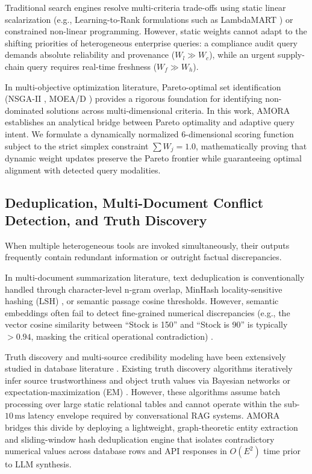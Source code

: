 \documentclass[journal,10pt,twocolumn]{IEEEtran}
\begin{document}
Traditional search engines resolve multi-criteria trade-offs using static linear scalarization (e.g., Learning-to-Rank formulations such as LambdaMART \cite{burges2010lambdamart}) or constrained non-linear programming. However, static weights cannot adapt to the shifting priorities of heterogeneous enterprise queries: a compliance audit query demands absolute reliability and provenance ($W_l \gg W_c$), while an urgent supply-chain query requires real-time freshness ($W_f \gg W_h$).

In multi-objective optimization literature, Pareto-optimal set identification (NSGA-II \cite{deb2002fast}, MOEA/D \cite{zhang2007moea}) provides a rigorous foundation for identifying non-dominated solutions across multi-dimensional criteria. In this work, AMORA establishes an analytical bridge between Pareto optimality and adaptive query intent. We formulate a dynamically normalized 6-dimensional scoring function subject to the strict simplex constraint $\sum W_j = 1.0$, mathematically proving that dynamic weight updates preserve the Pareto frontier while guaranteeing optimal alignment with detected query modalities.

\subsection{Deduplication, Multi-Document Conflict Detection, and Truth Discovery}
When multiple heterogeneous tools are invoked simultaneously, their outputs frequently contain redundant information or outright factual discrepancies.

In multi-document summarization literature, text deduplication is conventionally handled through character-level n-gram overlap, MinHash locality-sensitive hashing (LSH) \cite{broder1997minhash}, or semantic passage cosine thresholds. However, semantic embeddings often fail to detect fine-grained numerical discrepancies (e.g., the vector cosine similarity between ``Stock is 150'' and ``Stock is 90'' is typically $>0.94$, masking the critical operational contradiction) \cite{min2023factscore}.

Truth discovery and multi-source credibility modeling have been extensively studied in database literature \cite{li2014resolving,zheng2017truth}. Existing truth discovery algorithms iteratively infer source trustworthiness and object truth values via Bayesian networks or expectation-maximization (EM) \cite{dawid1979maximum}. However, these algorithms assume batch processing over large static relational tables and cannot operate within the sub-$10\,\text{ms}$ latency envelope required by conversational RAG systems. AMORA bridges this divide by deploying a lightweight, graph-theoretic entity extraction and sliding-window hash deduplication engine that isolates contradictory numerical values across database rows and API responses in $O(E^2)$ time prior to LLM synthesis.
\end{document}
